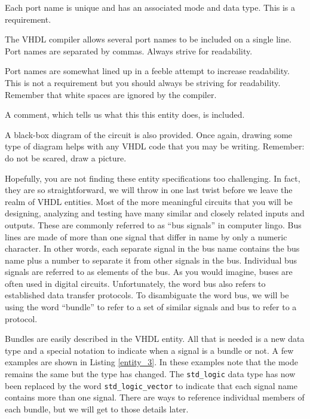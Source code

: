 \begin{my_list}
\item Each port name is unique and has an associated mode and data type. This is a requirement.
\item The VHDL compiler allows several port names to be included on a single line. Port names are separated by commas. Always strive for readability.
\item Port names are somewhat lined up in a feeble attempt to increase readability. This is not a requirement but you should always be striving for readability. Remember that white spaces are ignored by the compiler.
\item A comment, which tells us what this this entity does, is included.
\item A black-box diagram of the circuit is also provided. Once again, drawing some type of diagram helps with any VHDL code that you may be writing. Remember: do not be scared, draw a picture.
\end{my_list}

Hopefully, you are not finding these entity specifications too challenging. In fact, they are so straightforward, we will throw in one last twist before we leave the realm of VHDL entities. Most of the more meaningful circuits that you will be designing, analyzing and testing have many similar and closely related inputs and outputs. These are commonly referred to as ``bus signals'' in computer lingo. Bus lines are made of more than one signal that differ in name by only a numeric character. In other words, each separate signal in the bus name contains the bus name plus a number to separate it from other signals in the bus. Individual bus signals are referred to as elements of the bus. As you would imagine, buses are often used in digital circuits. Unfortunately, the word bus also refers to established data transfer protocols. To disambiguate the word bus, we will be using the word ``bundle'' to refer to a set of similar signals and bus to refer to a protocol.

Bundles are easily described in the VHDL entity. All that is needed is a new data type and a special notation to indicate when a signal is a bundle or not. A few examples are shown in Listing \ref{entity_3}. In these examples note that the mode remains the same but the type has changed. The \texttt{std\_logic} data type has now been replaced by the word \texttt{std\_logic\_vector} to indicate that each signal name contains more than one signal. There are ways to reference individual members of each bundle, but we will get to those details later.

